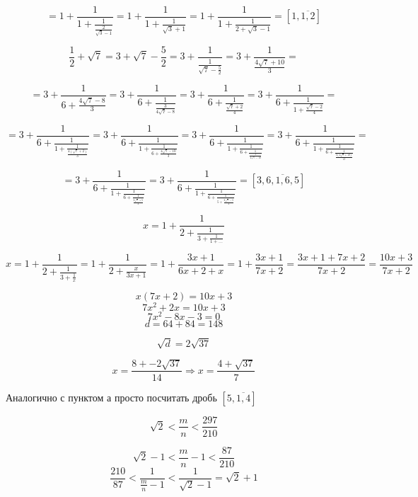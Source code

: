 $$= 1 + \frac{1}{1 + \frac{1}{\frac{2}{ \sqrt{3} - 1}}} = 1 + \frac{1}{1 + \frac{1}{ \sqrt{3} + 1}} = 1 + \frac{1}{1 + \frac{1}{ 2 + \sqrt{3} - 1}} = [1, \overline{1, 2}]$$


$$\frac{1}{2} + \sqrt{7} = 3 + \sqrt{7} - \frac{5}{2} = 3 + \frac{1}{\frac{1}{\sqrt{7} - \frac{5}{2}}} = 3 + \frac{1}{\frac{4\sqrt{7} + 10}{3}} = $$

$$= 3 + \frac{1}{6 + \frac{4\sqrt{7} - 8}{3}} = 3 + \frac{1}{6 + \frac{1}{\frac{3}{4\sqrt{7} - 8}}} = 3 + \frac{1}{6 + \frac{1}{\frac{\sqrt{7} + 2}{4}}} = 3 + \frac{1}{6 + \frac{1}{1 + \frac{\sqrt{7} - 2}{4}}} =$$

$$= 3 + \frac{1}{6 + \frac{1}{1 + \frac{1}{\frac{4(\sqrt{7} + 2)}{3}}}}= 3 + \frac{1}{6 + \frac{1}{1 + \frac{1}{6 + \frac{4\sqrt{7} - 10}{3}}}} = 3 + \frac{1}{6 + \frac{1}{1 + \frac{1}{6 + \frac{1}{\frac{3}{4\sqrt{7} - 10}}}}} = 3 + \frac{1}{6 + \frac{1}{1 + \frac{1}{6 + \frac{1}{\frac{3(4\sqrt{7} + 10)}{12}}}}} =$$

$$= 3 + \frac{1}{6 + \frac{1}{1 + \frac{1}{6 + \frac{1}{\frac{2\sqrt{7} + 5}{2}}}}} = 3 + \frac{1}{6 + \frac{1}{1 + \frac{1}{6 + \frac{1}{5 + \frac{2\sqrt{7} - 5}{2}}}}} = [3, \overline{6,1,6,5}]$$



$$x = 1 + \frac{1}{2 + \frac{1}{3 + \frac{1}{1 + ...}}}$$

$$x = 1 + \frac{1}{2 + \frac{1}{3 + \frac{1}{x}}} = 1 + \frac{1}{2 + \frac{x}{3x + 1}} = 1 + \frac{3x + 1}{6x + 2 + x} = 1 + \frac{3x + 1}{7x + 2} = \frac{3x + 1 + 7x + 2}{7x + 2} = \frac{10x + 3}{7x + 2}$$

$$x (7x + 2) = 10x + 3$$
$$7x^2 + 2x = 10x + 3$$
$$7x^2 - 8x - 3 = 0$$
$$d = 64 + 84 = 148$$

$$\sqrt{d} = 2\sqrt{37}$$

$$x = \frac{8 +- 2\sqrt{37}}{14} \Rightarrow x = \frac{4 + \sqrt{37}}{7}$$


Аналогично с пунктом а просто посчитать дробь $[5, \overline{1, 4}]$



$$\sqrt{2} < \frac{m}{n} < \frac{297}{210}$$

$$\sqrt{2} - 1 < \frac{m}{n} - 1 < \frac{87}{210}$$
$$\frac{210}{87} < \frac{1}{\frac{m}{n} - 1} < \frac{1}{\sqrt{2} - 1} = \sqrt{2} + 1$$





